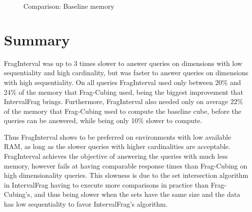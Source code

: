 \begin{figure}[!htb]
  \caption{Comparison: Baseline memory}\label{fig:interval:baseline}
  \vspace{6mm}
  \begin{center}
  \end{center}
  \vspace{2mm}
\end{figure}

\section{Summary}\label{ch:interval:summary}

FragInterval was up to 3 times slower to answer queries on dimensions with low sequentiality and high cardinality, but was faster to answer queries on dimensions with high sequentiality.
On all queries FragInterval used only between 20\% and 24\% of the memory that Frag-Cubing used, being the biggest improvement that IntervalFrag brings.
Furthermore, FragInterval also needed only on average 22\% of the memory that Frag-Cubing used to compute the baseline cube, before the queries can be answered, while being only 10\% slower to compute.

Thus FragInterval shows to be preferred on environments with low available RAM, as long as the slower queries with higher cardinalities are acceptable.
FragInterval achieves the objective of answering the queries with much less memory, however fails at having comparable response times than Frag-Cubing on high dimensionality queries.
This slowness is due to the set intersection algorithm in IntervalFrag having to execute more comparisons in practice than Frag-Cubing's, and thus being slower when the sets have the same size and the data has low sequentiality to favor IntervalFrag's algorithm.


